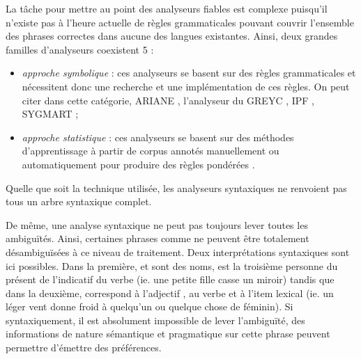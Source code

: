 La tâche pour mettre au point des analyseurs fiables est complexe puisqu'il n'existe pas à l'heure
actuelle de règles grammaticales pouvant couvrir l'ensemble des
phrases correctes dans aucune des langues existantes. Ainsi, deux
grandes familles d'analyseurs coexistent \citep{Bangalore1997}{5} :

\begin{itemize}
  
\item \emph{approche symbolique} : ces analyseurs se basent sur des
  règles grammaticales et nécessitent donc une recherche et une
  implémentation de ces règles. On peut citer dans cette catégorie,
  ARIANE \cite{Boitet2000}, l'analyseur du GREYC \cite{Vergne1998},
  IPF \cite{Wehrli1992}, SYGMART \cite{Chauche1984} ;
\item \emph{approche statistique} : ces analyseurs se basent sur des
  méthodes d'apprentissage à partir de corpus annotés manuellement ou
  automatiquement pour produire des règles pondérées \cite{Church1988,
    Collins1997, Munoz2000}.
\end{itemize}

Quelle que soit la technique utilisée, les analyseurs syntaxiques ne
renvoient pas tous un arbre syntaxique complet. %

De même, une analyse syntaxique ne peut pas toujours lever toutes les
ambiguïtés.  Ainsi, certaines phrases comme  ne peuvent être totalement désambiguïsées à ce niveau de
traitement. Deux interprétations syntaxiques sont ici
possibles. Dans la première,  et  sont des
noms,  est la troisième personne du présent de l'indicatif
du verbe  (ie. une petite fille casse un miroir)
tandis que dans la deuxième,  correspond à l'adjectif
,  au verbe  et 
à l'item lexical  (ie. un léger vent donne froid à
quelqu'un ou quelque chose de féminin). Si syntaxiquement, il est
absolument impossible de lever l'ambiguïté, des informations de nature
sémantique et pragmatique sur cette phrase peuvent permettre d'émettre
des préférences.


